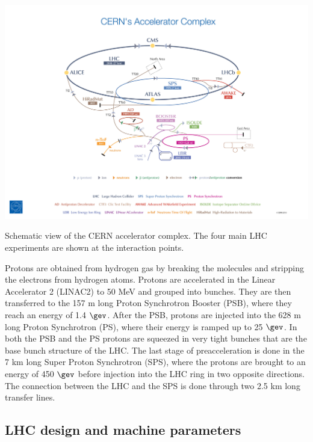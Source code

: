 \bfig[h!]
\includegraphics[width=\textwidth]{figures/Detector/CERNaccelerator}
\captionsetup{width=0.85\textwidth} \caption{\small Schematic view of the CERN accelerator complex. The four main LHC experiments are shown at the interaction points.}
\label{sec:det:fig:acccomplex}
\efig

Protons are obtained from hydrogen gas by breaking the molecules and stripping the electrons from hydrogen atoms. Protons are accelerated in the Linear Accelerator 2 (LINAC2) to 50 MeV and grouped into bunches. They are then transferred to the 157 m long Proton Synchrotron Booster (PSB), where they reach an energy of 1.4 $\gev$. After the PSB, protons are injected into the 628 m long Proton Synchrotron (PS), where their energy is ramped up to 25 $\gev$. In both the PSB and the PS protons are squeezed in very tight bunches that are the base bunch structure of the LHC. The last stage of preacceleration is done in the 7 km long Super Proton Synchrotron (SPS), where the protons are brought to an energy of 450 $\gev$ before injection into the LHC ring in two opposite directions. The connection between the LHC and the SPS is done through two 2.5 km long transfer lines.

\subsection{LHC design and machine parameters}
\label{chp:det:LHC:design}

